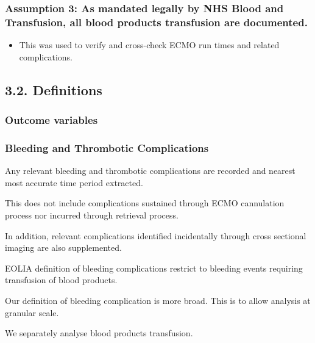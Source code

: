 \documentclass[
]{article}
\providecommand{\tightlist}{%
  \setlength{\itemsep}{0pt}\setlength{\parskip}{0pt}}
\begin{document}
\hypertarget{assumption-3-as-mandated-legally-by-nhs-blood-and-transfusion-all-blood-products-transfusion-are-documented.}{%
\subsubsection{Assumption 3: As mandated legally by NHS Blood and
Transfusion, all blood products transfusion are
documented.}\label{assumption-3-as-mandated-legally-by-nhs-blood-and-transfusion-all-blood-products-transfusion-are-documented.}}

\begin{itemize}
\tightlist
\item
  This was used to verify and cross-check ECMO run times and related
  complications.
\end{itemize}

\hypertarget{definitions}{%
\subsection{3.2. Definitions}\label{definitions}}

\hypertarget{outcome-variables-1}{%
\subsubsection{Outcome variables}\label{outcome-variables-1}}

\hypertarget{bleeding-and-thrombotic-complications}{%
\subsubsection{Bleeding and Thrombotic
Complications}\label{bleeding-and-thrombotic-complications}}

Any relevant bleeding and thrombotic complications are recorded and
nearest most accurate time period extracted.

This does not include complications sustained through ECMO cannulation
process nor incurred through retrieval process.

In addition, relevant complications identified incidentally through
cross sectional imaging are also supplemented.

EOLIA definition of bleeding complications restrict to bleeding events
requiring transfusion of blood products.

Our definition of bleeding complication is more broad. This is to allow
analysis at granular scale.

We separately analyse blood products transfusion.
\end{document}
